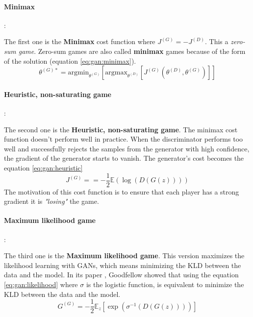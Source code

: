 \documentclass[12pt]{report}
\begin{document}
\paragraph{Minimax}:

The first one is the \textbf{Minimax} cost function where $J^{(G)} = - J^{(D)}$.
This a \textit{zero-sum game}.
Zero-sum games are also called \textbf{minimax} games because of the form of the solution (equation \ref{eq:gan:minimax}).
\begin{equation}
    \theta^{(G)*} = \text{argmin}_{\theta^{(G)}} \left[ \text{argmax}_{\theta^{(D)}} \left[ J^{(G)} \left( \theta^{(D)}, \theta^{(G)} \right) \right] \right]
    \label{eq:gan:minimax}
\end{equation}

\paragraph{Heuristic, non-saturating game}:

The second one is the \textbf{Heuristic, non-saturating game}.
The minimax cost function doesn't perform well in practice.
When the discriminator performs too well and successfully rejects the samples from the generator with high confidence, the gradient of the generator starts to vanish.
The generator's cost becomes the equation \ref{eq:gan:heuristic}
\begin{equation}
    J^{(G)} = = - \frac{1}{2} \mathbb{E} (\log(D(G(z))))
    \label{eq:gan:heuristic}
\end{equation}
The motivation of this cost function is to ensure that each player has a strong gradient it is \textit{"losing"} the game.

\paragraph{Maximum likelihood game}:

The third one is the \textbf{Maximum likelihood game}.
This version maximizes the likelihood learning with GANs, which means minimizing the KLD between the data and the model.
In its paper \cite{goodfellow_generative_2014}, Goodfellow showed that using the equation \ref{eq:gan:likelihood} where $\sigma$ is the logistic function, is equivalent to minimize the KLD between the data and the model.
\begin{equation}
    G^{(G)} = - \frac{1}{2} \mathbb{E}_{z} \left[ \exp \left( \sigma^{-1} (D(G(z))) \right) \right]
    \label{eq:gan:likelihood}
\end{equation}
\end{document}
